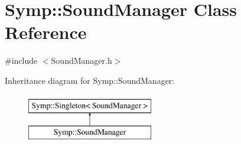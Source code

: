 \hypertarget{class_symp_1_1_sound_manager}{\section{Symp\-:\-:Sound\-Manager Class Reference}
\label{class_symp_1_1_sound_manager}
}


{\ttfamily \#include $<$Sound\-Manager.\-h$>$}

Inheritance diagram for Symp\-:\-:Sound\-Manager\-:\begin{figure}[H]
\begin{center}
\leavevmode
\includegraphics[height=2.000000cm]{class_symp_1_1_sound_manager}
\end{center}
\end{figure}
